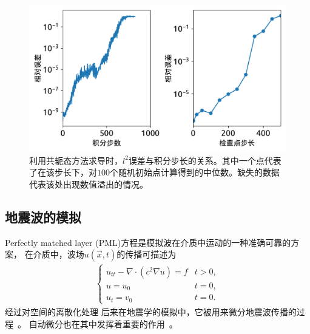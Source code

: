 \documentclass[A4,twoside,fontset=ubuntu,UTF8]{ctexart}
\begin{document}
\begin{figure}[t]
\centering
\includegraphics[width=0.6\columnwidth]{./fig2.pdf}
    \caption{利用共轭态方法求导时，$l^2$误差与积分步长的关系。其中一个点代表了在该步长下，对$100$个随机初始点计算得到的中位数。缺失的数据代表该处出现数值溢出的情况。\label{fig:neuralode-error}} 
\end{figure}


\baselineskip
\subsection{地震波的模拟}
Perfectly matched layer (PML)方程是模拟波在介质中运动的一种准确可靠的方案，
在介质中，波场$u(\vec x, t)$的传播可描述为
\begin{align}
    \begin{cases}
    u_{tt} - \nabla\cdot(c^2\nabla u) = f & t>0,\\
    u = u_0 & t=0,\\
    u_t = v_0 & t=0.
    \end{cases}
\end{align}
经过对空间的离散化处理
后来在地震学的模拟中，它被用来微分地震波传播的过程~\cite{Symes2007}。
自动微分也在其中发挥着重要的作用~\cite{Zhu2020}。
~\cite{Grote2010}

\baselineskip
\end{document}
